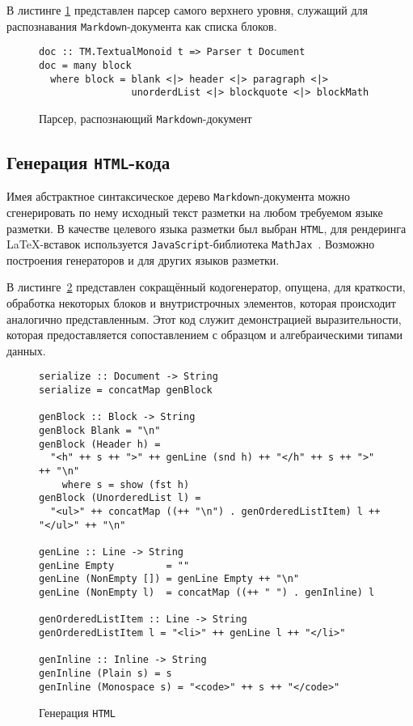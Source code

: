 В листинге \ref{listing:MarkdownDoc} представлен парсер самого верхнего уровня, служащий для распознавания \lstinline{Markdown}-документа как списка блоков.

\begin{figure}[h]
\begin{lstlisting}
doc :: TM.TextualMonoid t => Parser t Document
doc = many block
  where block = blank <|> header <|> paragraph <|> 
                unorderdList <|> blockquote <|> blockMath
\end{lstlisting}
\caption{Парсер, распознающий \lstinline{Markdown}-документ}
\label{listing:MarkdownDoc}
\end{figure} 

\subsection{Генерация \lstinline{HTML}-кода}

Имея абстрактное синтаксическое дерево \lstinline{Markdown}-документа можно сгенерировать по нему исходный текст разметки на любом требуемом языке разметки. В качестве целевого языка разметки был выбран \lstinline{HTML}, для рендеринга \LaTeX -вставок используется \lstinline{JavaScript}-библиотека \lstinline{MathJax}~\autocite{MathJax}. Возможно построения генераторов и для других языков разметки. 

В листинге~\ref{listing:HTMLGen} представлен сокращённый кодогенератор, опущена, для краткости, обработка некоторых блоков и внутристрочных элементов, которая происходит аналогично представленным. Этот код служит демонстрацией выразительности, которая предоставляется сопоставлением с образцом и алгебраическими типами данных.

\begin{figure}[h]
\begin{lstlisting}
serialize :: Document -> String
serialize = concatMap genBlock

genBlock :: Block -> String
genBlock Blank = "\n"
genBlock (Header h) = 
  "<h" ++ s ++ ">" ++ genLine (snd h) ++ "</h" ++ s ++ ">" ++ "\n"
    where s = show (fst h)
genBlock (UnorderedList l) = 
  "<ul>" ++ concatMap ((++ "\n") . genOrderedListItem) l ++ "</ul>" ++ "\n"

genLine :: Line -> String
genLine Empty         = ""
genLine (NonEmpty []) = genLine Empty ++ "\n"
genLine (NonEmpty l)  = concatMap ((++ " ") . genInline) l    

genOrderedListItem :: Line -> String
genOrderedListItem l = "<li>" ++ genLine l ++ "</li>" 

genInline :: Inline -> String
genInline (Plain s) = s
genInline (Monospace s) = "<code>" ++ s ++ "</code>"
\end{lstlisting}
\caption{Генерация \lstinline{HTML}}
\label{listing:HTMLGen}
\end{figure}  

